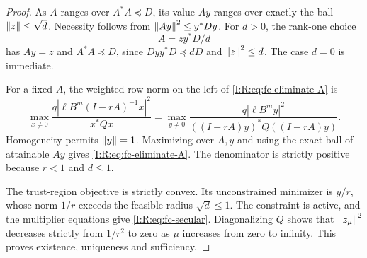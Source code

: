 \begin{proof}
As $A$ ranges over $A^*A\preceq D$, its value $Ay$ ranges over exactly the ball
$\left\lVert z\right\rVert\le\sqrt d$. Necessity follows from $\left\lVert Ay\right\rVert^2\le y^*Dy$. For
$d>0$, the rank-one choice
\[
 A=zy^*D/d
\]
has $Ay=z$ and $A^*A\preceq D$, since
$Dyy^*D\preceq dD$ and $\left\lVert z\right\rVert^2\le d$. The case $d=0$ is immediate.

For a fixed $A$, the weighted row norm on the left of
\eqref{I:R:eq:fc-eliminate-A} is
\[
 \max_{x\ne0}\frac{q|\ell B^m(I-rA)^{-1}x|^2}{x^*Qx}
 =\max_{y\ne0}\frac{q|\ell B^m y|^2}
                          {((I-rA)y)^*Q((I-rA)y)}.
\]
Homogeneity permits $\left\lVert y\right\rVert=1$. Maximizing over $A,y$ and using the exact
ball of attainable $Ay$ gives \eqref{I:R:eq:fc-eliminate-A}. The denominator is
strictly positive because $r<1$ and $d\le1$.

The trust-region objective is strictly convex. Its unconstrained minimizer is
$y/r$, whose norm $1/r$ exceeds the feasible radius $\sqrt d\le1$.
The constraint is active, and the multiplier equations give
\eqref{I:R:eq:fc-secular}. Diagonalizing $Q$ shows that
$\left\lVert z_\mu\right\rVert^2$ decreases strictly from $1/r^2$ to zero as $\mu$ increases
from zero to infinity. This proves existence, uniqueness and sufficiency.
\end{proof}

